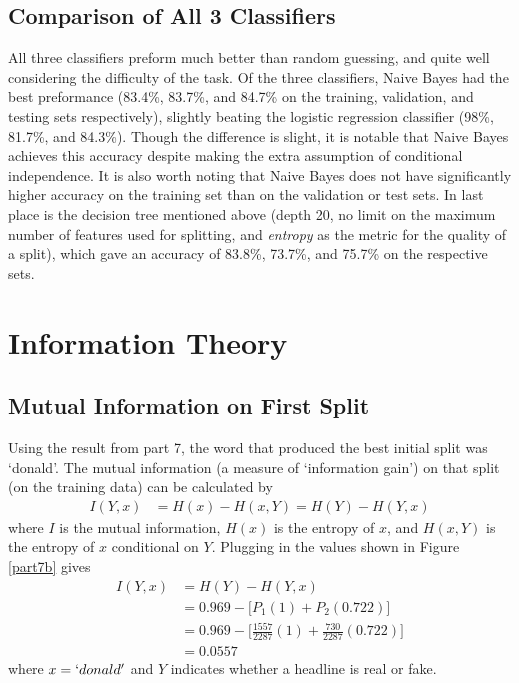 \documentclass{article}
\begin{document}
   \subsection{Comparison of All 3 Classifiers}
   All three classifiers preform much better than random guessing, and quite well considering the
   difficulty of the task. Of the three classifiers, Naive Bayes had the best preformance (83.4\%, 83.7\%,
   and 84.7\% on the training, validation, and testing sets respectively), slightly beating the logistic
   regression classifier (98\%, 81.7\%, and 84.3\%). Though the difference is slight, it is notable that
   Naive Bayes achieves this accuracy despite making the extra assumption of conditional independence. It
   is also worth noting that Naive Bayes does not have significantly higher accuracy on the training set than
   on the validation or test sets.
   In last place is the decision tree mentioned above (depth 20, no limit on the maximum number of features
   used for splitting, and \textit{entropy} as the metric for the quality of a split), which gave an accuracy
   of 83.8\%, 73.7\%, and 75.7\% on the respective sets.




   \section{Information Theory}
   \subsection{Mutual Information on First Split}
   Using the result from part 7, the word that produced the best initial split was `donald'. The mutual information
   (a measure of `information gain') on that split (on the training data) can be calculated by
   \begin{equation*} \begin{split}
      I(Y, x)  &= H(x) - H(x, Y) = H(Y) - H(Y,x)
   \end{split} \end{equation*}
   where $I$ is the mutual information, $H(x)$ is the entropy of $x$, and $H(x, Y)$ is the entropy of $x$ conditional
   on $Y$.
   Plugging in the values shown in Figure \ref{part7b} gives
   \begin{equation*} \begin{split}
      I(Y, x)  &= H(Y) - H(Y,x) \\
               &= 0.969 - \bigg[ P_1 (1) + P_2 (0.722)  \bigg] \\
               &= 0.969 - \bigg[ \frac{1557}{2287} (1) + \frac{730}{2287} (0.722)  \bigg] \\
               &= 0.0557
   \end{split} \end{equation*}
   where $x = `donald'$ and $Y$ indicates whether a headline is real or fake.
\end{document}
